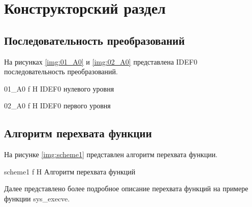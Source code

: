 \chapter{Конструкторский раздел}

\section{Последовательность преобразований}

На рисунках \ref{img:01_A0} и \ref{img:02_A0} представлена IDEF0 последовательность преобразований.

{01_A0}
{f}
{H}
{\textwidth}
{IDEF0 нулевого уровня}

{02_A0}
{f}
{H}
{\textwidth}
{IDEF0 первого уровня}

\section{Алгоритм перехвата функции}

На рисунке \ref{img:scheme1} представлен алгоритм перехвата функции.

		{scheme1}
		{f}
		{H}
		{\textwidth}
		{Алгоритм перехвата функций}
		
Далее представлено более подробное описание перехвата функций на примере функции sys\_execve.

